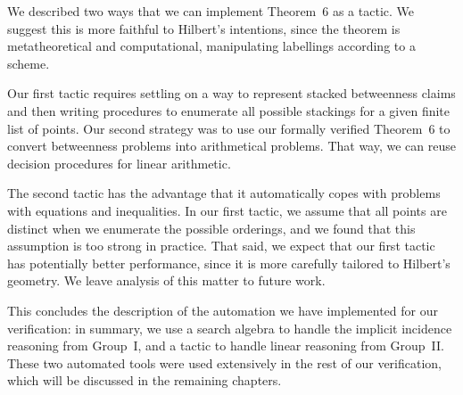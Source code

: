 We described two ways that we can implement Theorem~6 as a tactic. We suggest this is more faithful to Hilbert's intentions, since the theorem is metatheoretical and computational, manipulating labellings according to a scheme.

Our first tactic requires settling on a way to represent stacked betweenness claims and then writing procedures to enumerate all possible stackings for a given finite list of points. Our second strategy was to use our formally verified Theorem~6 to convert betweenness problems into arithmetical problems. That way, we can reuse decision procedures for linear arithmetic.

The second tactic has the advantage that it automatically copes with problems with equations and inequalities. In our first tactic, we assume that all points are distinct when we enumerate the possible orderings,  and we found that this assumption is too strong in practice. That said, we expect that our first tactic has potentially better performance, since it is more carefully tailored to Hilbert's geometry. We leave analysis of this matter to future work.

This concludes the description of the automation we have implemented for our verification: in summary, we use a search algebra to handle the implicit incidence reasoning from Group~I, and a tactic to handle linear reasoning from Group~II. These two automated tools were used extensively in the rest of our verification, which will be discussed in the remaining chapters. 





